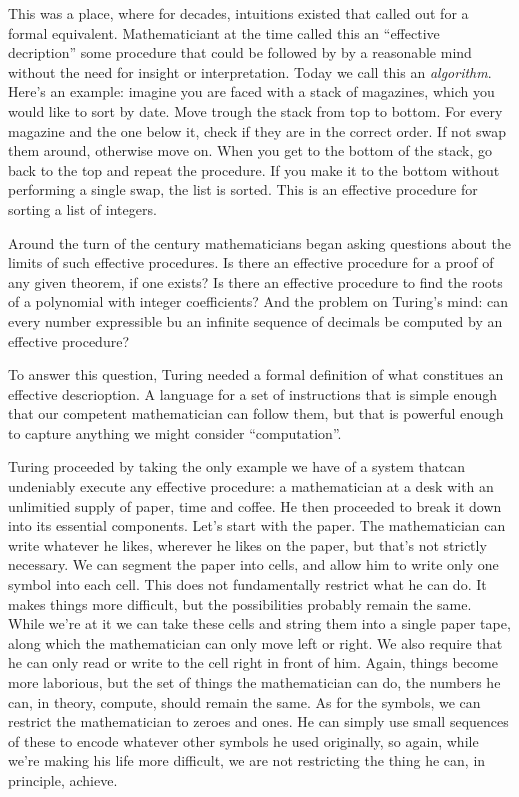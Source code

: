This was a place, where for decades, intuitions existed that called out for a formal equivalent. Mathematiciant at the time called this an ``effective decription'' some procedure that could be followed by by a reasonable mind without the need for insight or interpretation. Today we call this an \emph{algorithm}. Here's an example: imagine you are faced with a stack of magazines, which you would like to sort by date. Move trough the stack from top to bottom. For every magazine and the one below it, check if they are in the correct order. If not swap them around, otherwise move on. When you get to the bottom of the stack, go back to the top and repeat the procedure. If you make it to the bottom without performing a single swap, the list is sorted. This is an effective procedure for sorting a list of integers.

Around the turn of the century mathematicians began asking questions about the limits of such effective procedures. Is there an effective procedure for a proof of any given theorem, if one exists? Is there an effective procedure to find the roots of a polynomial with integer coefficients? And the problem on Turing's mind: can every number expressible bu an infinite sequence of decimals be computed by an effective procedure?

To answer this question, Turing needed a formal definition of what constitues an effective descrioption. A language for a set of instructions that is simple enough that our competent mathematician can follow them, but that is powerful enough to capture anything we might consider ``computation''. 

Turing proceeded by taking the only example we have of a system thatcan undeniably execute any effective procedure: a mathematician at a desk with an unlimitied supply of paper, time and coffee. He then proceeded to break it down into its essential components. Let's start with the paper. The mathematician can write whatever he likes, wherever he likes on the paper, but that's not strictly necessary. We can segment the paper into cells, and allow him to write only one symbol into each cell. This does not fundamentally restrict what he can do. It makes things more difficult, but the possibilities probably remain the same. While we're at it we can take these cells and string them into a single paper tape, along which the mathematician can only move left or right. We also require that he can only read or write to the cell right in front of him. Again, things become more laborious, but the set of things the mathematician can do, the numbers he can, in theory, compute, should remain the same. As for the symbols, we can restrict the mathematician to zeroes and ones. He can simply use small sequences of these to encode whatever other symbols he used originally, so again, while we're making his life more difficult, we are not restricting the thing he can, in principle, achieve.

